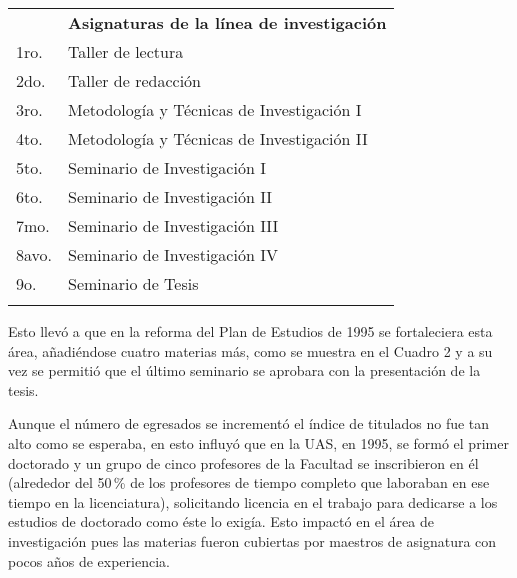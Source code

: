 \begin{flushleft}
\tablefirsthead{}
\tablehead{}
\tabletail{}
\tablelasttail{}
\setlength{\extrarowheight}{1pt}
\begin{supertabular}{|m{0.2\textwidth}|m{0.75\textwidth}|}
\hline
{}\\\hline
{} &
{\small\bfseries Asignaturas de la línea de investigación}\\\hline
1ro. &
Taller de lectura\\\hline
2do.  &
Taller de redacción\\\hline
3ro. &
Metodología y Técnicas de Investigación I\\\hline
4to. &
Metodología y Técnicas de Investigación II\\\hline
5to. &
 Seminario de Investigación I\\\hline
6to. &
 Seminario de Investigación II\\\hline
7mo. &
 Seminario de Investigación III\\\hline
8avo. &
 Seminario de Investigación IV\\\hline
9o. &
Seminario de Tesis\\\hline%
{}\\%
\end{supertabular}
\end{flushleft}

Esto llevó a que en la reforma del Plan de Estudios de 1995 se 
fortaleciera esta área, añadiéndose cuatro materias más, como se 
muestra en el Cuadro 2 y a su vez se permitió que el último seminario 
se aprobara con la presentación de la tesis.

Aunque el número de egresados se incrementó el índice de 
titulados no fue tan alto como se esperaba, en esto influyó que en la 
UAS, en 1995, se formó el primer doctorado y un grupo de cinco 
profesores de la Facultad se inscribieron en él (alrededor del 50\,\% 
de los profesores de tiempo completo que laboraban en ese tiempo en la 
licenciatura), solicitando licencia en el trabajo para dedicarse a los 
estudios de doctorado como éste lo exigía. Esto impactó en el área de 
investigación pues las materias fueron cubiertas por maestros de 
asignatura con pocos años de experiencia. 

